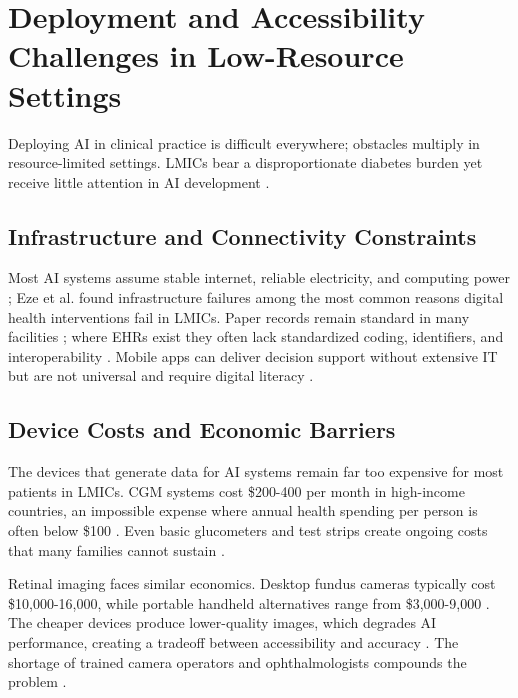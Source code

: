 \section{Deployment and Accessibility Challenges in Low-Resource Settings}

Deploying AI in clinical practice is difficult everywhere; obstacles multiply in resource-limited settings. LMICs bear a disproportionate diabetes burden yet receive little attention in AI development \cite{sun2022idf, olusanya2024mitigating}.

\subsection{Infrastructure and Connectivity Constraints}

Most AI systems assume stable internet, reliable electricity, and computing power \cite{mackenzie2023diabetes, ghosh2025artificial, desai2025barriers}; Eze et al. \cite{eze2022sustainability} found infrastructure failures among the most common reasons digital health interventions fail in LMICs. Paper records remain standard in many facilities \cite{raj2024federated, ghosh2025artificial}; where EHRs exist they often lack standardized coding, identifiers, and interoperability \cite{mackenzie2023diabetes, olusanya2024mitigating}. Mobile apps can deliver decision support without extensive IT \cite{rodriguez2023applications, ghosh2025artificial, alam2024machine} but are not universal and require digital literacy \cite{mackenzie2023diabetes}.

\subsection{Device Costs and Economic Barriers}

The devices that generate data for AI systems remain far too expensive for most patients in LMICs. CGM systems cost \$200-400 per month in high-income countries, an impossible expense where annual health spending per person is often below \$100 \cite{ghosh2025artificial, idf2021atlas}. Even basic glucometers and test strips create ongoing costs that many families cannot sustain \cite{alhaddad2022sense}.

Retinal imaging faces similar economics. Desktop fundus cameras typically cost \$10,000-16,000, while portable handheld alternatives range from \$3,000-9,000 \cite{raj2024federated, zhang2025systematic}. The cheaper devices produce lower-quality images, which degrades AI performance, creating a tradeoff between accessibility and accuracy \cite{zhang2025systematic}. The shortage of trained camera operators and ophthalmologists compounds the problem \cite{zhang2025systematic, guan2023artificial}.

